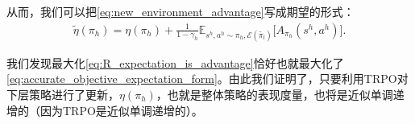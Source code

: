 \documentclass[degree=bachelor, tocarialchapter, pifootnote]{thuthesis}
\begin{document}
从而，我们可以把\eqref{eq:new_environment_advantage}写成期望的形式：
\begin{align}
  \tilde{\eta}(\pi_h) = \eta(\pi_h) + \frac{1}{1-\gamma_h}\mathbb{E}_{s^h, a^h \sim \pi_h, \mathcal{E}(\tilde{\pi_l})}\bigg[A_{\pi_h}(s^h, a^h)\bigg].
  \label{eq:accurate_objective_expectation_form}
\end{align}

我们发现最大化\eqref{eq:R_expectation_is_advantage}恰好也就最大化了\eqref{eq:accurate_objective_expectation_form}。由此我们证明了，只要利用TRPO对下层策略进行了更新，$\eta(\pi_h)$，也就是整体策略的表现度量，也将是近似单调递增的（因为TRPO是近似单调递增的）。

\end{document}
